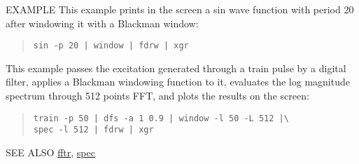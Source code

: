 \begin{qsection}{EXAMPLE}
This example prints in the screen a sin wave function
with period 20 after windowing it with a Blackman window:
\begin{quote}
  \verb!sin -p 20 | window | fdrw | xgr !
\end{quote}
\par
This example passes the excitation generated through a train pulse
by a digital filter, applies a Blackman windowing function to it,
evaluates the log magnitude spectrum through 512 points FFT,
and plots the results on the screen:
\begin{quote}
\verb!train -p 50 | dfs -a 1 0.9 | window -l 50 -L 512 |\! \\
\verb!spec -l 512 | fdrw | xgr!
\end{quote}
\end{qsection}

\begin{qsection}{SEE ALSO}
\hyperlink{fftr}{fftr},
\hyperlink{spec}{spec}
\end{qsection}
